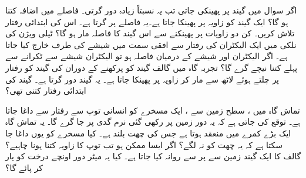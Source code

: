 اگر  سوال  میں گیند  پر پھینکی جاتی تب یہ نسبتاً زیادہ دور گرتی۔ فاصلے میں اضافہ کتنا ہو گا؟
ایک گیند کو   زاویہ پر پھینکا جاتا ہے۔یہ  فاصلے  پر گرتا ہے۔ اس کی ابتدائی رفتار تلاش کریں۔ کن دو  زاویات  پر پھینکنے سے اس گیند کا فاصلہ مار  ہو گا؟
ٹیلی ویژن کی نلکی میں ایک الیکٹران  کی رفتار سے افقی سمت میں شیشے کی طرف خارج کیا جاتا ہے۔ اگر الیکٹران اور شیشے کے درمیان فاصلہ  ہو تو الیکٹران شیشے سے ٹکرانے سے پہلے کتنا نیچے گرے گا؟
تجربہ گاہ  میں گالف  گیند کو پرکھنے کے دوران    کی گیند کو  رفتار پر چلتے ہوئے لاٹھ سے مار کر   زاویہ پر پھینکا جاتا ہے۔ یہ گیند      دور گرتا ہے۔ گیند کی ابتدائی رفتار کتنی تھی؟  

تماش گاہ   میں ، سطح زمین سے   ، ایک مسخرے   کو انسانی  توپ سے  رفتار سے داغا جاتا  ہے۔ توقع کی جاتی ہے کہ یہ  دور زمین پر رکھی گئی  نرم  گدی  پر جا گرے گا۔ یہ تماش گاہ  ایک بڑے کمرے میں منعقد ہوتا ہے جس کی چھت  بلند ہے۔  کیا مسخرے کو یوں داغا جا سکتا ہے کہ یہ چھت کو نہ لگے؟ اگر ایسا ممکن ہو تب توپ کا زاویہ کتنا ہونا چاہیے؟
 گالف  کا ایک گیند  زمین سے   پر    سے روانہ کیا جاتا ہے۔ کیا یہ  میٹر دور  اونچے درخت کو پار کر پائے گا؟

